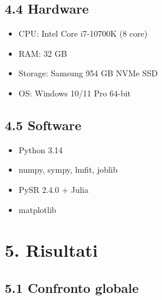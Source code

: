 \documentclass[
]{article}
\providecommand{\tightlist}{%
  \setlength{\itemsep}{0pt}\setlength{\parskip}{0pt}}
\begin{document}
\subsection{4.4 Hardware}\label{hardware}

\begin{itemize}
\tightlist
\item
  CPU: Intel Core i7-10700K (8 core)
\item
  RAM: 32 GB
\item
  Storage: Samsung 954 GB NVMe SSD
\item
  OS: Windows 10/11 Pro 64-bit
\end{itemize}

\subsection{4.5 Software}\label{software}

\begin{itemize}
\tightlist
\item
  Python 3.14
\item
  numpy, sympy, lmfit, joblib
\item
  PySR 2.4.0 + Julia
\item
  matplotlib
\end{itemize}

\section{5. Risultati}\label{risultati-1}

\subsection{5.1 Confronto globale}\label{confronto-globale}
\end{document}
